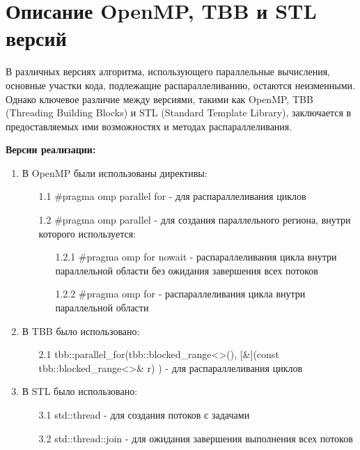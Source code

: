 \documentclass{report}
\begin{document}
\newpage

\section* {Описание OpenMP, TBB и STL версий}
\par В различных версиях алгоритма, использующего параллельные вычисления, основные участки кода, подлежащие распараллеливанию, остаются неизменными. Однако ключевое различие между версиями, такими как OpenMP, TBB (Threading Building Blocks) и STL (Standard Template Library), заключается в предоставляемых ими возможностях и методах распараллеливания.
\par \textbf{Версии реализации:}
\begin{enumerate}
    \item В OpenMP были использованы директивы:
    \vspace{0.5em}
    \begin{enumerate}
        \item[1.1] \#pragma omp parallel for - для распараллеливания циклов
        \item[1.2] \#pragma omp parallel - для создания параллельного региона, внутри которого используется:
        \vspace{0.5em}
        \begin{enumerate}
            \item[1.2.1] \#pragma omp for nowait - распараллеливания цикла внутри параллельной области без ожидания завершения всех потоков
            \item[1.2.2]\#pragma omp for - распараллеливания цикла внутри параллельной области
        \end{enumerate} 
    \end{enumerate}   
    \item В TBB было использовано:
    \vspace{0.5em}
    \begin{enumerate}
        \item[2.1]  tbb::parallel\_for(tbb::blocked\_range<>(), [\&](const tbb::blocked\_range<>\& r) {}) -  для распараллеливания циклов
    \end{enumerate} 
    \item В STL было использовано:
    \vspace{0.5em}
    \begin{enumerate}
        \item[3.1]  std::thread - для создания потоков с задачами
        \item[3.2]  std::thread::join - для ожидания завершения выполнения всех потоков
    \end{enumerate} 
\end{enumerate}
\end{document}
